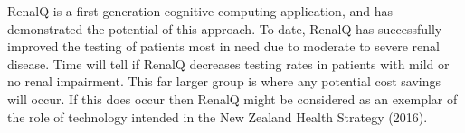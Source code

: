 ﻿\documentclass[11pt]{article}
\begin{document}
RenalQ is a first generation cognitive computing application, and has demonstrated the potential of this approach. To date, RenalQ has successfully improved the testing of patients most in need due to moderate to severe renal disease. Time will tell if RenalQ decreases testing rates in patients with mild or no renal impairment. This far larger group is where any potential cost savings will occur. If this does occur then RenalQ might be considered as an exemplar of the role of technology intended in the New Zealand Health Strategy (2016).





\end{document}
